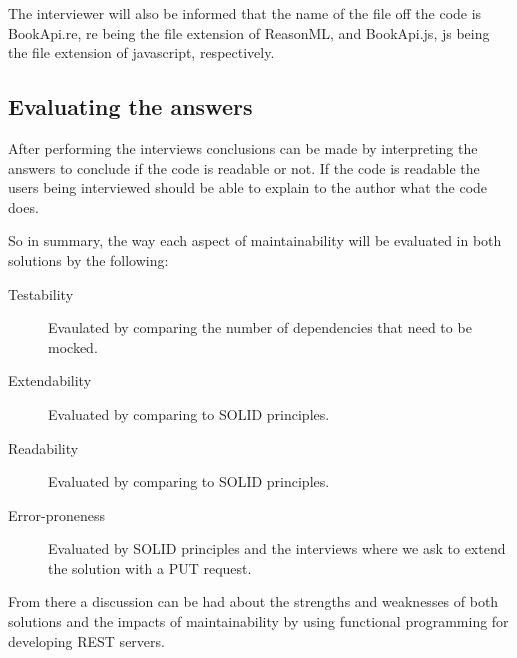 The interviewer will also be informed that the name of the file off the code is
BookApi.re, re being the file extension of ReasonML, and BookApi.js, js being
the file extension of javascript, respectively. 

\subsection{Evaluating the answers}

After performing the interviews conclusions can be made by interpreting the
answers to conclude if the code is readable or not. If the code is readable the
users being interviewed should be able to explain to the author what the code
does.

So in summary, the way each aspect of maintainability will be evaluated in both
solutions by the following:

\begin{description}
    \item [Testability] Evaulated by comparing the number of dependencies that
    need to be mocked. 
    \item [Extendability] Evaluated by comparing to SOLID principles.
    \item [Readability] Evaluated by comparing to SOLID principles.
    \item [Error-proneness] Evaluated by SOLID principles and the interviews
        where we ask to extend the solution with a PUT request.
\end{description}

From there a discussion can be had about the strengths and weaknesses of both
solutions and the impacts of maintainability by using functional programming for
developing REST servers.





